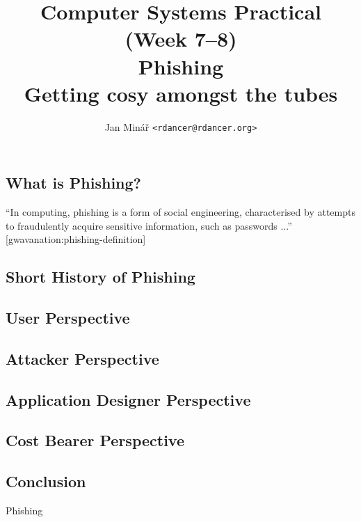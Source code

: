 \documentclass[10pt]{article}
\author{Jan Minář {\tt <rdancer@rdancer.org>}}
\title{Computer Systems Practical (Week 7--8)\\Phishing\\Getting cosy amongst the tubes}
\begin{document}
\subsection{What is Phishing?}
``In computing, phishing is a form of social engineering, characterised by attempts to fraudulently acquire sensitive information, such as passwords ...'' [gwavanation:phishing-definition]

\subsection{Short History of Phishing}


\subsection{User Perspective}
\subsection{Attacker Perspective}
\subsection{Application Designer Perspective}
\subsection{Cost Bearer Perspective}
\subsection{Conclusion}

\maketitle

Phishing




\end{document}
